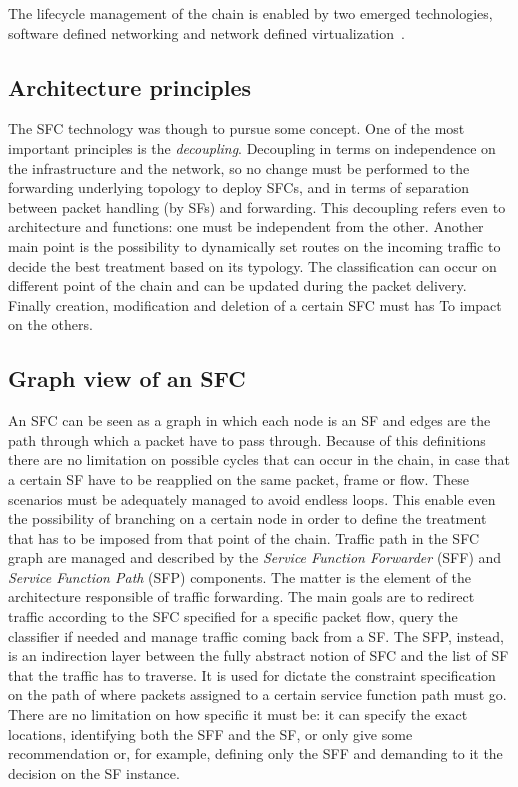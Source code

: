 The lifecycle management of the chain is enabled by two emerged technologies,
software defined networking and network defined
virtualization~\cite{medhat2017service}.

\subsection{Architecture principles}
The SFC technology was though to pursue some concept. One of the most important
principles is the \emph{decoupling}. Decoupling in terms on independence on the
infrastructure and the network, so no change must be performed to the
forwarding underlying topology to deploy SFCs, and in terms of separation
between packet handling (by SFs) and forwarding. This decoupling refers even to
architecture and functions: one must be independent from the other. Another
main point is the possibility to dynamically set routes on the incoming traffic
to decide the best treatment based on its typology. The classification can
occur on different point of the chain and can be updated during the packet
delivery. Finally creation, modification and deletion of a certain SFC must has
To impact on the others.

\subsection{Graph view of an SFC}
An SFC can be seen as a graph in which each node is an SF and edges are the
path through which a packet have to pass through. Because of this definitions
there are no limitation on possible cycles that can occur in the chain, in case
that a certain SF have to be reapplied on the same packet, frame or flow. These
scenarios must be adequately managed to avoid endless loops. This enable even
the possibility of branching on a certain node in order to define the treatment
that has to be imposed from that point of the chain. Traffic path in the SFC
graph are managed and described by the \emph{Service Function Forwarder} (SFF)
and \emph{Service Function Path} (SFP) components. The matter is the element of
the architecture responsible of traffic forwarding. The main goals are to
redirect traffic according to the SFC specified for a specific packet flow,
query the classifier if needed and manage traffic coming back from a SF. The
SFP, instead, is an indirection layer between the fully abstract notion of SFC
and the list of SF that the traffic has to traverse. It is used for dictate the
constraint specification on the path of where packets assigned to a certain
service function path must go. There are no limitation on how specific it must
be: it can specify the exact locations, identifying both the SFF and the SF, or
only give some recommendation or, for example, defining only the SFF and
demanding to it the decision on the SF instance.


